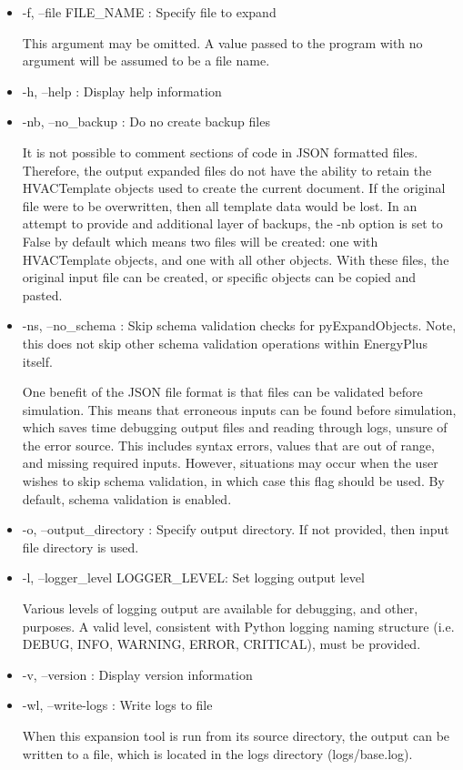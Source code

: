 \begin{itemize}

\item
  -f, --file FILE\_NAME : Specify file to expand
  
  This argument may be omitted.  A value passed to the program with no argument will be assumed to be a file name.
  
\item
  -h, --help : Display help information

\item
  -nb, --no\_backup : Do no create backup files
  
  It is not possible to comment sections of code in JSON formatted files.  Therefore, the output expanded files do not have the ability to retain the HVACTemplate objects used to create the current document.  If the original file were to be overwritten, then all template data would be lost.  In an attempt to provide and additional layer of backups, the -nb option is set to False by default which means two files will be created: one with HVACTemplate objects, and one with all other objects.  With these files, the original input file can be created, or specific objects can be copied and pasted.

\item
  -ns, --no\_schema : Skip schema validation checks for pyExpandObjects.  Note, this does not skip other schema validation operations within EnergyPlus itself.
  
  One benefit of the JSON file format is that files can be validated before simulation.  This means that erroneous inputs can be found before simulation, which saves time debugging output files and reading through logs, unsure of the error source.  This includes syntax errors, values that are out of range, and missing required inputs.  However, situations may occur when the user wishes to skip schema validation, in which case this flag should be used.  By default, schema validation is enabled.

\item
  -o, --output\_directory : Specify output directory.  If not provided, then input file directory is used.
  
\item
  -l, --logger\_level LOGGER\_LEVEL: Set logging output level 
  
  Various levels of logging output are available for debugging, and other, purposes.  A valid level, consistent with Python logging naming structure (i.e. DEBUG, INFO, WARNING, ERROR, CRITICAL), must be provided.
  
\item
  -v, --version : Display version information  

\item
  -wl, --write-logs : Write logs to file
  
  When this expansion tool is run from its source directory, the output can be written to a file, which is located in the logs directory (logs/base.log).
  
\end{itemize}
